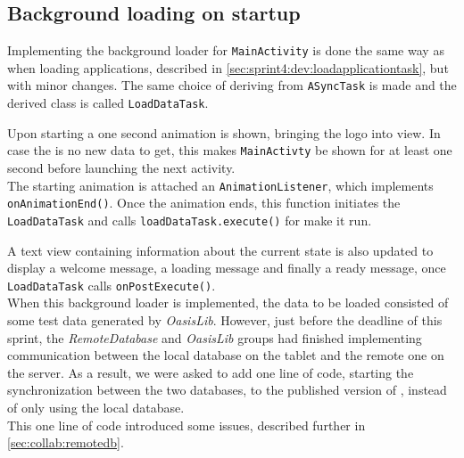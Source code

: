 \subsection{Background loading on startup}\label{sec:sprint4:dev:remotedbandbgloading}

Implementing the background loader for \lstinline|MainActivity| is done the same way as when loading applications, described in \cref{sec:sprint4:dev:loadapplicationtask}, but with minor changes.
The same choice of deriving from \lstinline!ASyncTask! is made and the derived class is called \lstinline!LoadDataTask!.

Upon starting \launcher a one second animation is shown, bringing the logo into view.
In case the is no new data to get, this makes \lstinline!MainActivty! be shown for at least one second before launching the next activity.\\

The starting animation is attached an \lstinline!AnimationListener!, which implements \lstinline|onAnimationEnd()|.
Once the animation ends, this function initiates the \lstinline!LoadDataTask! and calls \lstinline!loadDataTask.execute()! for make it run.

A text view containing information about the current state is also updated to display a welcome message, a loading message and finally a ready message, once \lstinline|LoadDataTask| calls \lstinline|onPostExecute()|.\\

When this background loader is implemented, the data to be loaded consisted of some test data generated by \textit{OasisLib}.
However, just before the deadline of this sprint, the \textit{RemoteDatabase} and \textit{OasisLib} groups had finished implementing communication between the local database on the tablet and the remote one on the server.
As a result, we were asked to add one line of code, starting the synchronization between the two databases, to the published version of \launcher, instead of only using the local database.\\

This one line of code introduced some issues, described further in \cref{sec:collab:remotedb}.